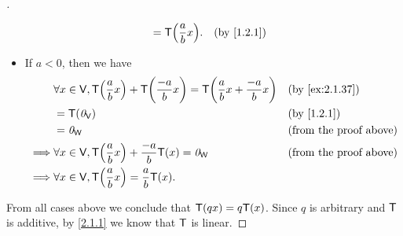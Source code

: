 \begin{proof}[]
\begin{itemize}
\begin{align*}
                                                & = \T\pa{\frac{a}{b} x}.               &  & \text{(by \cref{1.2.1})}
          \end{align*}
    \item If \(a < 0\), then we have
          \begin{align*}
                     & \forall x \in \V, \T\pa{\frac{a}{b} x} + \T\pa{\frac{-a}{b} x} = \T\pa{\frac{a}{b} x + \frac{-a}{b} x} &  & \text{(by \cref{ex:2.1.37})}  \\
                     & = \T(\zv_{\V})                                                                                         &  & \text{(by \cref{1.2.1})}      \\
                     & = \zv_{\W}                                                                                             &  & \text{(from the proof above)} \\
            \implies & \forall x \in \V, \T\pa{\frac{a}{b} x} + \frac{-a}{b} \T(x) = \zv_{\W}                                 &  & \text{(from the proof above)} \\
            \implies & \forall x \in \V, \T\pa{\frac{a}{b} x} = \frac{a}{b} \T(x).
          \end{align*}
  \end{itemize}
  From all cases above we conclude that \(\mathsf{T}(qx) = q \mathsf{T}(x)\).
  Since \(q\) is arbitrary and \(\mathsf{T}\) is additive, by \cref{2.1.1} we know that \(\mathsf{T}\) is linear.
\end{proof}
